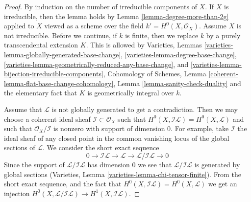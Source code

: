 \documentclass{stacks-project}
\theoremstyle{plain}
\theoremstyle{definition}
\theoremstyle{remark}
\numberwithin{equation}{subsection}
\begin{document}
\begin{proof}
By induction on the number of irreducible components of $X$.
If $X$ is irreducible, then the lemma holds by
Lemma \ref{lemma-degree-more-than-2g}
applied to $X$ viewed as a scheme over the field
$k' = H^0(X, \mathcal{O}_X)$. Assume $X$ is not irreducible.
Before we continue, if $k$ is finite, then we replace $k$
by a purely transcendental extension $K$. This is allowed by
Varieties, Lemmas
\ref{varieties-lemma-globally-generated-base-change},
\ref{varieties-lemma-degree-base-change},
\ref{varieties-lemma-geometrically-reduced-any-base-change}, and
\ref{varieties-lemma-bijection-irreducible-components},
Cohomology of Schemes, Lemma \ref{coherent-lemma-flat-base-change-cohomology},
Lemma \ref{lemma-sanity-check-duality} and the elementary fact that
$K$ is geometrically integral over $k$.

\medskip\noindent
Assume that $\mathcal{L}$ is not globally generated to get a contradiction.
Then we may choose a coherent ideal sheaf
$\mathcal{I} \subset \mathcal{O}_X$ such that
$H^0(X, \mathcal{I}\mathcal{L}) = H^0(X, \mathcal{L})$
and such that $\mathcal{O}_X/\mathcal{I}$ is nonzero with
support of dimension $0$. For example, take $\mathcal{I}$
the ideal sheaf of any closed point in the common
vanishing locus of the global sections of $\mathcal{L}$.
We consider the short exact sequence
$$
0 \to \mathcal{I}\mathcal{L} \to \mathcal{L} \to 
\mathcal{L}/\mathcal{I}\mathcal{L} \to 0
$$
Since the support of $\mathcal{L}/\mathcal{I}\mathcal{L}$
has dimension $0$ we see that $\mathcal{L}/\mathcal{I}\mathcal{L}$
is generated by global sections
(Varieties, Lemma \ref{varieties-lemma-chi-tensor-finite}).
From the short exact sequence,
and the fact that $H^0(X, \mathcal{I}\mathcal{L}) = H^0(X, \mathcal{L})$
we get an injection
$H^0(X, \mathcal{L}/\mathcal{I}\mathcal{L}) \to H^1(X, \mathcal{I}\mathcal{L})$.


\end{proof}
\end{document}
